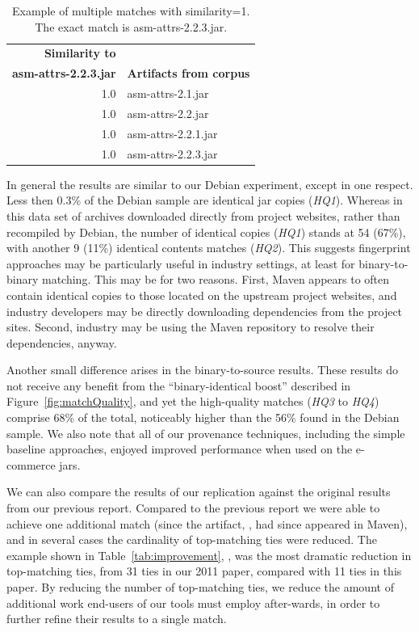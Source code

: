 \begin{table}[htbp]
    \centering
    \begin{tabular}{rl}
        \textbf{Similarity to}  & \\
        \textbf{asm-attrs-2.2.3.jar}  &  \textbf{Artifacts from corpus}\\
        \hline\hline
        1.0 & asm-attrs-2.1.jar    \\
        1.0 & asm-attrs-2.2.jar    \\
        1.0 & asm-attrs-2.2.1.jar  \\
        1.0 & asm-attrs-2.2.3.jar  \\
        \hline
    \end{tabular}
    \vspace{1mm}
    \caption{Example of multiple matches with similarity=1.  The
    exact match is asm-attrs-2.2.3.jar.}
    \label{tab:contiguous}
\end{table}

In general the results are similar to our Debian experiment, except in one
respect.  Less then 0.3\% of the Debian sample are identical jar copies
(\emph{HQ1}).  Whereas in this data set of archives downloaded directly
from project websites, rather than recompiled by Debian, the number of
identical copies (\emph{HQ1}) stands at 54 (67\%), with another 9 (11\%)
identical contents matches (\emph{HQ2}).  This suggests fingerprint
approaches may be particularly useful in industry settings, at least for
binary-to-binary matching.  This may be for two reasons.  First, Maven
appears to often contain identical copies to those located on the upstream
project websites, and industry developers may be directly downloading
dependencies from the project sites.  Second, industry may be using the
Maven repository to resolve their dependencies, anyway.

Another small difference arises in the binary-to-source results.
These results do not receive any benefit from the ``binary-identical
boost'' described in Figure~\ref{fig:matchQuality}, and yet the
high-quality matches (\emph{HQ3} to \emph{HQ4}) comprise 68\% of the total,
noticeably higher than the 56\% found in the Debian sample.
We also note that all of our
provenance techniques, including the simple baseline approaches, enjoyed
improved performance when used on the e-commerce jars.

We can also compare the results of our replication against the original
results from our previous report.  Compared to the previous report
we were able to achieve one additional match (since the artifact, ,
had since appeared in Maven), and in several cases the cardinality of top-matching
ties were reduced.   The example shown in Table~\ref{tab:improvement}, ,
was the most dramatic reduction in top-matching ties, from 31 ties in our 2011 paper,
compared with 11 ties in this paper.  By reducing the number of
top-matching ties, we reduce the amount of additional work end-users of our tools
must employ after-wards, in order to further refine their results to a single match.


